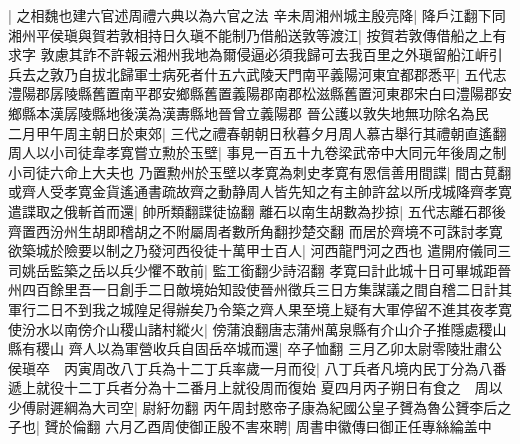 |{
	之相魏也建六官述周禮六典以為六官之法}
辛未周湘州城主殷亮降|{
	降戶江翻下同}
湘州平侯瑱與賀若敦相持日久瑱不能制乃借船送敦等渡江|{
	按賀若敦傳借船之上有求字}
敦慮其詐不許報云湘州我地為爾侵逼必須我歸可去我百里之外瑱留船江㟁引兵去之敦乃自拔北歸軍士病死者什五六武陵天門南平義陽河東宜都郡悉平|{
	五代志澧陽郡孱陵縣舊置南平郡安鄉縣舊置義陽郡南郡松滋縣舊置河東郡宋白曰澧陽郡安鄉縣本漢孱陵縣地後漢為漢夀縣地晉曾立義陽郡}
晉公護以敦失地無功除名為民　二月甲午周主朝日於東郊|{
	三代之禮春朝朝日秋暮夕月周人慕古舉行其禮朝直遙翻}
周人以小司徒韋孝寛嘗立勲於玉壁|{
	事見一百五十九卷梁武帝中大同元年後周之制小司徒六命上大夫也}
乃置勲州於玉壁以孝寛為刺史孝寛有恩信善用間諜|{
	間古莧翻}
或齊人受孝寛金貨遙通書疏故齊之動静周人皆先知之有主帥許盆以所戌城降齊孝寛遣諜取之俄斬首而還|{
	帥所類翻諜徒協翻}
離石以南生胡數為抄掠|{
	五代志離石郡後齊置西汾州生胡即稽胡之不附屬周者數所角翻抄楚交翻}
而居於齊境不可誅討孝寛欲築城於險要以制之乃發河西役徒十萬甲士百人|{
	河西龍門河之西也}
遣開府儀同三司姚岳監築之岳以兵少懼不敢前|{
	監工銜翻少詩沼翻}
孝寛曰計此城十日可畢城距晉州四百餘里吾一日創手二日敵境始知設使晉州徵兵三日方集謀議之間自稽二日計其軍行二日不到我之城隍足得辦矣乃令築之齊人果至境上疑有大軍停留不進其夜孝寛使汾水以南傍介山稷山諸村縱火|{
	傍蒲浪翻唐志蒲州萬泉縣有介山介子推隱處稷山縣有稷山}
齊人以為軍營收兵自固岳卒城而還|{
	卒子恤翻}
三月乙卯太尉零陵壯肅公侯瑱卒　丙寅周改八丁兵為十二丁兵率歲一月而役|{
	八丁兵者凡境内民丁分為八番遞上就役十二丁兵者分為十二番月上就役周而復始}
夏四月丙子朔日有食之　周以少傅尉遲綱為大司空|{
	尉紆勿翻}
丙午周封愍帝子康為紀國公皇子贇為魯公贇李后之子也|{
	贇於倫翻}
六月乙酉周使御正殷不害來聘|{
	周書申徽傳曰御正任專絲綸盖中}


